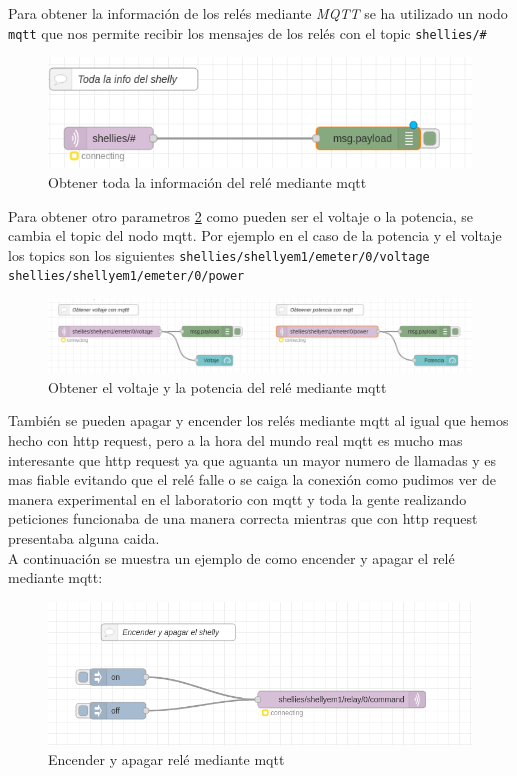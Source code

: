 \documentclass[11pt, letterpaper]{article}
\begin{document}
Para obtener la información de los relés mediante \textit{MQTT} se ha utilizado un nodo \texttt{mqtt} que nos permite 
recibir los mensajes de los relés con el topic \texttt{shellies/\#} 

\begin{figure}[h]
    \centering
    \includegraphics[width=\textwidth]{info_shelly_mqtt.png}
    \caption{Obtener toda la información del relé mediante mqtt} 
    \label{fig:info_shelly_mqtt}
\end{figure}
\pagebreak
Para obtener otro parametros \ref{fig:voltaje_pontencia_mqtt} como pueden ser el voltaje o la potencia, se cambia el topic del nodo mqtt.
Por ejemplo en el caso de la potencia y el voltaje los topics son los siguientes \texttt{shellies/shellyem1/emeter/0/voltage}
\texttt{shellies/shellyem1/emeter/0/power} 

\begin{figure}[h]
    \centering
    \includegraphics[width=\textwidth]{Voltaje_potencia_mqtt.png}
    \caption{Obtener el voltaje y la potencia del relé mediante mqtt}
    \label{fig:voltaje_pontencia_mqtt}
\end{figure}

También se pueden apagar y encender los relés mediante mqtt al igual que hemos hecho con http request, pero a la hora 
del mundo real mqtt es mucho mas interesante que http request ya que aguanta un mayor numero de llamadas y es mas fiable evitando 
que el relé falle o se caiga la conexión como pudimos ver de manera experimental en el laboratorio con mqtt y toda la gente realizando peticiones
funcionaba de una manera correcta mientras que con http request presentaba alguna caida.\\


A continuación se muestra un ejemplo de como encender y apagar el relé mediante mqtt:

\begin{figure}[h]
    \centering
    \includegraphics[width=\textwidth]{encender_apagar_mqtt.png}
    \caption{Encender y apagar relé mediante mqtt}
    \label{fig:encender_apagar_mqtt}
\end{figure}
\pagebreak
\end{document}

